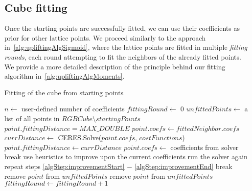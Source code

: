 \subsection{Cube fitting}
Once the starting points are successfully fitted, we can use their coefficients as prior for other lattice points. We proceed similarly to the approach in~\cref{alg:upliftingAlgSigmoid}, where the lattice points are fitted in multiple \emph{fitting rounds}, each round attempting to fit the neighbors of the already fitted points. We provide a more detailed description of the principle behind our fitting algorithm in~\cref{alg:upliftingAlgMoments}.

\begin{algorithm}[t!]
	\caption{Fitting of the cube from starting points}
	\label{alg:upliftingAlgMoments}
	\begin{algorithmic}[1]
		\State $n \gets $ user-defined number of coefficients
		\State $fittingRound \gets$ $0$
		\State $unfittedPoints \gets$ a list of all points in $RGBCube \setminus startingPoints$
		\State $point.fittingDistance = MAX\_DOUBLE$
		\EndFor
		\State $point.coefs \gets fittedNeighbor.coefs$
		 \label{algStep:conversionBegin}
		 \label{algStep:conversionEnd}
		\EndIf 
		\State $currDistance \gets $ CERES.Solve($point.coefs$, $costFunctions$)
		 \label{algStep:improvementStart}
		\State $point.fittingDistance \gets currDistance$
		\State $point.coefs \gets $ coefficients from solver
		\EndIf
		\State break
		\EndIf \label{algStep:improvementEnd}
		\EndFor
		 \label{algStep:heuristicsStart}
		\State use heuristics to improve upon the current coefficients
		\State run the solver again
		\State repeat steps \ref{algStep:improvementStart} $-$ \ref{algStep:improvementEnd}
		\State break \label{algStep:heuristicsEnd}
		\EndIf
		\EndWhile
		\State remove $point$ from $unfittedPoints$
		\EndIf
		\State remove $point$ from $unfittedPoints$
		\EndIf
		\EndFor	
		\State $fittingRound \gets fittingRound+1$
		\EndWhile
	\end{algorithmic}
\end{algorithm}

